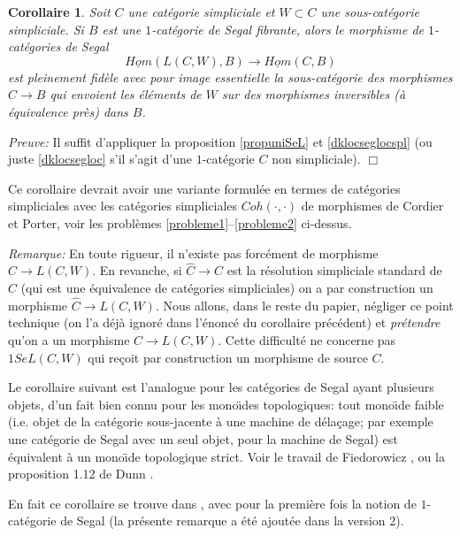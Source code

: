 \documentclass[12pt]{article}
\newcommand{\eop}{\hfill $\Box$\vspace{.1in}}
\newtheorem{corollaire}[lemma]{Corollaire}
\begin{document}
\begin{corollaire}
\label{propunivM}
Soit $C$ une cat\'egorie simpliciale et $W\subset C$ une sous-cat\'egorie
simpliciale. Si $B$ est une $1$-cat\'egorie de Segal fibrante, alors
le morphisme de $1$-cat\'egories de Segal
$$
\underline{Hom}(L(C,W), B)\rightarrow \underline{Hom}(C,B)
$$
est pleinement fid\`ele avec pour image essentielle la
sous-cat\'egorie des morphismes $C\rightarrow B$ qui envoient
les \'el\'ements de $W$ sur des
morphismes inversibles (\`a \'equivalence pr\`es) dans $B$.
\end{corollaire}
{\em Preuve:}
Il suffit
d'appliquer la proposition \ref{propuniSeL} et \ref{dklocseglocspl} (ou juste
\ref{dklocsegloc} s'il s'agit d'une $1$-cat\'egorie $C$ non simpliciale).
\eop

Ce corollaire devrait avoir une variante formul\'ee en termes de
cat\'egories simpliciales avec les cat\'egories simpliciales
$Coh(\cdot , \cdot )$ de  morphismes de Cordier et Porter, voir les probl\`emes
\ref{probleme1}--\ref{probleme2} ci-dessus.

{\em Remarque:} En toute rigueur, il n'existe pas forc\'ement de morphisme
$C\rightarrow L(C,W)$. En revanche, si $\widehat{C}\rightarrow C$
est la r\'esolution
simpliciale standard de $C$ (qui est une \'equivalence de cat\'egories
simpliciales) on a par construction \cite{DwyerKan1} un morphisme
$\widehat{C}\rightarrow L(C,W)$. Nous allons, dans le reste du papier,
n\'egliger
ce point technique (on l'a d\'ej\`a ignor\'e dans l'\'enonc\'e du corollaire
pr\'ec\'edent) et {\em pr\'etendre} qu'on a un morphisme $C\rightarrow L(C,W)$.
Cette difficult\'e ne concerne pas $1SeL(C,W)$
qui re\c{c}oit par construction
un morphisme de source $C$.

\bigskip



Le corollaire suivant est l'analogue pour les cat\'egories de Segal ayant
plusieurs objets, d'un fait bien connu pour les mono\"{\i}des
topologiques: tout mono\"{\i}de faible (i.e. objet de la cat\'egorie
sous-jacente \`a
une machine de d\'ela\c{c}age; par exemple une cat\'egorie de Segal avec un seul
objet, pour la machine de Segal) est \'equivalent \`a un mono\"{\i}de
topologique
strict. Voir le travail de
Fiedorowicz \cite{Fiedorowicz}, ou la proposition 1.12 de Dunn
\cite{Dunn}.

En fait ce corollaire se trouve 
dans \cite{DKS}, avec pour la premi\`ere fois
la notion de $1$-cat\'egorie de Segal (la pr\'esente remarque 
a \'et\'e ajout\'ee dans la version 2).
\end{document}
